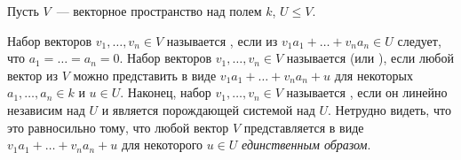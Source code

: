 
Пусть $V$~--- векторное пространство над полем $k$, $U\leq V$.

\begin{definition}
Набор векторов $v_1,\dots,v_n\in V$ называется , если
из $v_1a_1+\dots+v_na_n\in U$ следует, что
$a_1=\dots=a_n=0$.
Набор векторов $v_1,\dots,v_n\in V$ называется  (или
), если любой вектор из $V$ можно представить в виде
$v_1a_1+\dots+v_na_n+u$ для некоторых
$a_1,\dots,a_n\in k$ и $u\in U$.
Наконец, набор $v_1,\dots,v_n\in V$ называется , если он линейно независим
над $U$ и является порождающей системой над $U$.
Нетрудно видеть, что это равносильно тому, что любой вектор $V$
представляется в виде $v_1a_1+\dots+v_na_n+u$ для
некоторого $u\in U$ {\em единственным образом}.
\end{definition}

